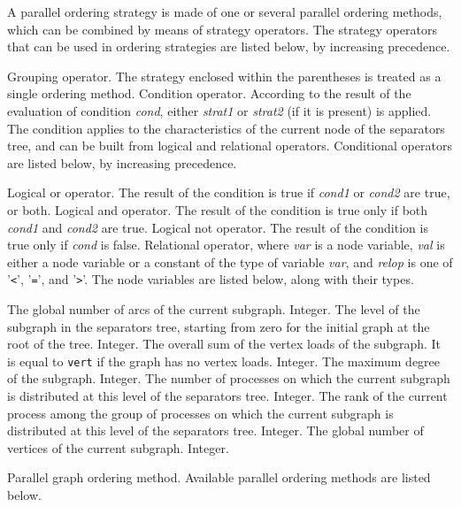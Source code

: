 A parallel ordering strategy is made of one or several parallel
ordering methods, which can be combined by means of strategy
operators. The strategy operators that can be used in ordering
strategies are listed below, by increasing precedence.
\begin{itemize}
\iteme[{\tt (}{\it strat\/}{\tt )}]
Grouping operator.
The strategy enclosed within the parentheses is treated as a single
ordering method.
Condition operator. According to the result of the evaluation of
condition {\it cond}, either {\it strat1\/} or {\it strat2\/} (if it
is present) is applied. The condition applies to the characteristics
of the current node of the separators tree, and can be built from
logical and relational operators. Conditional operators are listed
below, by increasing precedence.
\begin{itemize}
Logical or operator. The result of the condition is true if {\it cond1\/}
or {\it cond2\/} are true, or both.
Logical and operator. The result of the condition is true only if both
{\it cond1\/} and {\it cond2\/} are true.
\iteme[{\tt !}{\it cond}]
Logical not operator. The result of the condition is true only if
{\it cond\/} is false.
Relational operator, where {\it var\/} is a node variable, {\it val\/} is
either a node variable or a constant of the type of variable {\it var}, and
{\it relop\/} is one of '{\tt\verb+<+}', '{\tt\verb+=+}', and '{\tt\verb+>+}'.
The node variables are listed below, along with their types.
\begin{itemize}
\iteme[{\tt edge}]
The global number of arcs of the current subgraph.
Integer.
\iteme[{\tt levl}]
The level of the subgraph in the separators tree, starting from zero
for the initial graph at the root of the tree.
Integer.
\iteme[{\tt load}]
The overall sum of the vertex loads of the subgraph. It is equal to
{\tt vert} if the graph has no vertex loads.
Integer.
\iteme[{\tt mdeg}]
The maximum degree of the subgraph.
Integer.
\iteme[{\tt proc}]
The number of processes on which the current subgraph is distributed
at this level of the separators tree.
Integer.
\iteme[{\tt rank}]
The rank of the current process among the group of processes on
which the current subgraph is distributed at this level of the
separators tree.
Integer.
\iteme[{\tt vert}]
The global number of vertices of the current subgraph.
Integer.
\end{itemize}
\end{itemize}
\iteme[{\it method\/}{[{\tt \{}{\it parameters\/}{\tt \}}]}]
Parallel graph ordering method. Available parallel ordering methods
are listed below.
\end{itemize}
